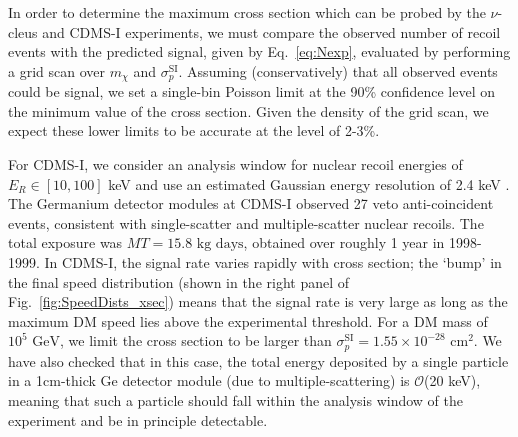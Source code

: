 \documentclass[prd,twocolumn,showpacs,nofootinbib,aps]{revtex4-1}
\begin{document}
In order to determine the maximum cross section which can be probed by the $\nu$-cleus and CDMS-I experiments, we must compare the observed number of recoil events with the predicted signal, given by Eq.~\eqref{eq:Nexp}, evaluated by performing a grid scan over $m_\chi$ and $\sigma_p^\mathrm{SI}$. Assuming (conservatively) that all observed events could be signal, we set a single-bin Poisson limit at the 90\% confidence level on the minimum value of the cross section. Given the density of the grid scan, we expect these lower limits to be accurate at the level of 2-3\%.


For CDMS-I, we consider an analysis window for nuclear recoil energies of $E_R \in [10, 100]$ keV and use an estimated Gaussian energy resolution of 2.4 keV \cite{Abrams:2002nb}. The Germanium detector modules at CDMS-I observed 27 veto anti-coincident events, consistent with single-scatter and multiple-scatter nuclear recoils. The total exposure  was $MT = 15.8\,\,\mathrm{kg}\,\, \mathrm{days}$, obtained over roughly 1 year in 1998-1999. In CDMS-I, the signal rate varies rapidly with cross section; the `bump' in the final speed distribution (shown in the right panel of Fig.~\ref{fig:SpeedDists_xsec}) means that the signal rate is very large as long as the maximum DM speed lies above the experimental threshold. For a DM mass of $10^5 \,\,\mathrm{GeV}$, we limit the cross section to be larger than $\sigma_p^\mathrm{SI} = 1.55 \times 10^{-28}\,\,\mathrm{cm}^2$. We have also checked that in this case, the total energy deposited by a single particle in a 1cm-thick Ge detector module (due to multiple-scattering) is $\mathcal{O}$(20 keV), meaning that such a particle should fall within the analysis window of the experiment and be in principle detectable.


\end{document}

